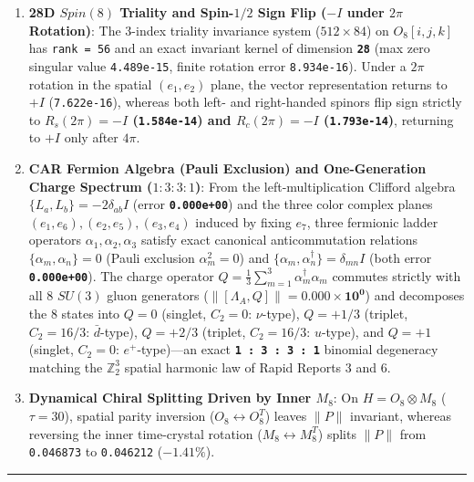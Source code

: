 \documentclass[
  a4paper,
]{article}
\providecommand{\tightlist}{%
  \setlength{\itemsep}{0pt}\setlength{\parskip}{0pt}}
\begin{document}
\begin{enumerate}
\def\labelenumi{\arabic{enumi}.}
\tightlist
\item
  \textbf{28D \(Spin(8)\) Triality and Spin-\(1/2\) Sign Flip (\(-I\)
  under \(2\pi\) Rotation)}: The 3-index triality invariance system
  (\(512\times 84\)) on \(O_8[i, j, k]\) has \texttt{rank\ =\ 56} and an
  exact invariant kernel of dimension \textbf{\texttt{28}} (max zero
  singular value \texttt{4.489e-15}, finite rotation error
  \texttt{8.934e-16}). Under a \(2\pi\) rotation in the spatial
  \((e_1, e_2)\) plane, the vector representation returns to \(+I\)
  (\texttt{7.622e-16}), whereas both left- and right-handed spinors flip
  sign strictly to \textbf{\(R_s(2\pi) = -I\) (\texttt{1.584e-14}) and
  \(R_c(2\pi) = -I\) (\texttt{1.793e-14})}, returning to \(+I\) only
  after \(4\pi\).
\item
  \textbf{CAR Fermion Algebra (Pauli Exclusion) and One-Generation
  Charge Spectrum (\(1:3:3:1\))}: From the left-multiplication Clifford
  algebra \(\{L_a, L_b\} = -2\delta_{ab}I\) (error
  \textbf{\texttt{0.000e+00}}) and the three color complex planes
  \((e_1,e_6), (e_2,e_5), (e_3,e_4)\) induced by fixing \(e_7\), three
  fermionic ladder operators \(\alpha_1, \alpha_2, \alpha_3\) satisfy
  exact canonical anticommutation relations
  \(\{\alpha_m, \alpha_n\} = 0\) (Pauli exclusion \(\alpha_m^2 = 0\))
  and \(\{\alpha_m, \alpha_n^\dagger\} = \delta_{mn}I\) (both error
  \textbf{\texttt{0.000e+00}}). The charge operator
  \(Q = \frac{1}{3}\sum_{m=1}^3 \alpha_m^\dagger \alpha_m\) commutes
  strictly with all 8 \(SU(3)\) gluon generators
  (\(\|[\Lambda_A, Q]\| = \mathbf{0.000\times 10^0}\)) and decomposes
  the 8 states into \(Q = 0\) (singlet, \(C_2=0\): \(\nu\)-type),
  \(Q = +1/3\) (triplet, \(C_2=16/3\): \(\bar{d}\)-type), \(Q = +2/3\)
  (triplet, \(C_2=16/3\): \(u\)-type), and \(Q = +1\) (singlet,
  \(C_2=0\): \(e^+\)-type)---an exact
  \textbf{\texttt{1\ :\ 3\ :\ 3\ :\ 1}} binomial degeneracy matching the
  \(\mathbb{Z}_2^3\) spatial harmonic law of Rapid Reports 3 and 6.
\item
  \textbf{Dynamical Chiral Splitting Driven by Inner \(M_8\)}: On
  \(H = O_8 \otimes M_8\) (\(\tau = 30\)), spatial parity inversion
  (\(O_8 \leftrightarrow O_8^T\)) leaves \(\|P\|\) invariant, whereas
  reversing the inner time-crystal rotation
  (\(M_8 \leftrightarrow M_8^T\)) splits \(\|P\|\) from
  \texttt{0.046873} to \texttt{0.046212} (\(-1.41\%\)).
\end{enumerate}

\begin{center}\rule{0.5\linewidth}{0.5pt}\end{center}
\end{document}
